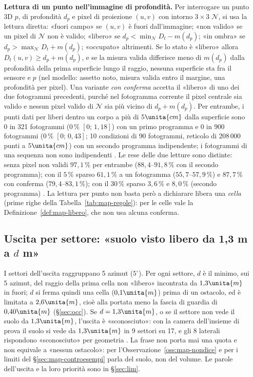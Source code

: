 \textbf{Lettura di un punto nell'immagine di profondità.} Per interrogare un punto 3D $p$, di profondità $d_p$ e pixel di proiezione $(u,v)$ con intorno $3\times3$ $\mathcal N$, si usa la lettura diretta: «fuori campo» se $(u,v)$ è fuori dall'immagine; «non valido» se un pixel di $\mathcal N$ non è valido; «libero» se $d_p<\min_{\mathcal N}D_t-m(d_p)$; «in ombra» se $d_p>\max_{\mathcal N}D_t+m(d_p)$; «occupato» altrimenti. Se lo stato è «libero» allora $D_t(u,v)\ge d_p+m(d_p)$, e se la misura valida differisce meno di $m(d_p)$ dalla profondità della prima superficie lungo il raggio, nessuna superficie sta fra il sensore e $p$  (nel modello: assetto noto, misura valida entro il margine, una profondità per pixel). Una variante \emph{con conferma} accetta il «libero» di uno dei due fotogrammi precedenti, purché nel fotogramma corrente il pixel centrale sia valido e nessun pixel valido di $\mathcal N$ sia più vicino di $d_p+m(d_p)$. Per entrambe, i punti dati per liberi dentro un corpo a più di $5\unita{cm}$ dalla superficie sono 0 in 321 fotogrammi ($0\,\%$ $[0;\,1{,}18]$) con un primo programma e 0 in 900 fotogrammi ($0\,\%$ $[0;\,0{,}43]$; 10 condizioni di 90 fotogrammi, reticolo di 208\,000 punti a $5\unita{cm}$) con un secondo programma indipendente; i fotogrammi di una sequenza non sono indipendenti . Le rese delle due letture sono distinte: senza pixel non validi $97{,}1\,\%$ per entrambe ($88{,}4$–$91{,}8\,\%$ con il secondo programma); con il $5\,\%$ sparso $61{,}1\,\%$ a un fotogramma ($55{,}7$–$57{,}9\,\%$) e $87{,}7\,\%$ con conferma ($79{,}4$–$83{,}1\,\%$); con il $30\,\%$ sparso $3{,}6\,\%$ e $8{,}0\,\%$ (secondo programma) . La lettura per punto non basta però a dichiarare libera una \emph{cella} (prime righe della Tabella~\ref{tab:map-regole}): per le celle vale la Definizione~\ref{def:map-libero}, che non usa alcuna conferma.

\subsection{Uscita per settore: «suolo visto libero da 1,3 m a $d$ m»}\label{sec:map-uscita}

I settori dell'uscita raggruppano 5 azimut ($5^\circ$). Per ogni settore, $d$ è il minimo, sui 5 azimut, del raggio della prima cella non «libero» incontrata da $1{,}3\unita{m}$ in fuori; $d$ si ferma quindi una cella ($0{,}1\unita{m}$) prima di un ostacolo, ed è limitata a $2{,}6\unita{m}$, cioè alla portata meno la fascia di guardia di $0{,}40\unita{m}$ (\S\ref{sec:occ}). Se $d=1{,}3\unita{m}$, o se il settore non vede il suolo da $1{,}3\unita{m}$, l'uscita è «sconosciuto»: con la camera dell'insieme di prova il suolo si vede da $1{,}3\unita{m}$ in 9 settori su 17, e gli 8 laterali rispondono «sconosciuto» per geometria . La frase non porta mai una quota e non equivale a «nessun ostacolo»: per l'Osservazione~\ref{oss:map-nondice} e per i limiti del \S\ref{sec:map-controesempi} parla del suolo, non del volume. Le parole dell'uscita e la loro priorità sono in \S\ref{sec:lim}.


